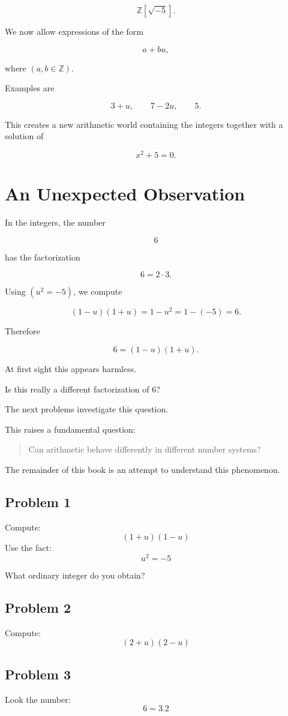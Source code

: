 \[
\mathbb Z[\sqrt{-5}].
\]


We now allow expressions of the form

\[
a+bu,
\]

where $(a,b\in\mathbb Z)$.

Examples are

\[
3+u,\qquad 7-2u,\qquad 5.
\]

This creates a new arithmetic world containing the integers together with a solution of

\[
x^2+5=0.
\]

\section{An Unexpected Observation}

In the integers, the number

\[
6
\]

has the factorization

\[
6=2\cdot3.
\]


Using $(u^2=-5)$, we compute

\[
(1-u)(1+u)=1-u^2=1-(-5)=6.
\]

Therefore

\[
6=(1-u)(1+u).
\]

At first sight this appears harmless.

Is this really a different factorization of \(6\)?

The next problems investigate this question.

This raises a fundamental question:

\begin{quote}
Can arithmetic behave differently in different number systems?
\end{quote}

The remainder of this book is an attempt to understand this phenomenon.

\subsection{Problem 1}
Compute: 
\[(1+u)(1-u)\]
Use the fact:
\[u^2 = -5\]

What ordinary integer do you obtain?

\subsection{Problem 2}
Compute:
\[(2+u)(2-u)\]

\subsection{Problem 3}
Look the number:
\[6 = 3.2\]

